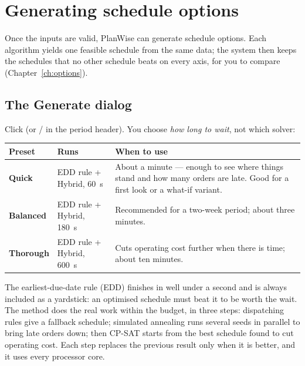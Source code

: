 \chapter{Generating schedule options}\label{ch:generate}

Once the inputs are valid, PlanWise can generate schedule options. Each algorithm yields one feasible
schedule from the same data; the system then keeps the schedules that no other schedule beats on every axis,
for you to compare (Chapter~\ref{ch:options}).


\section{The Generate dialog}

Click  (or  /  in the period header).
You choose \emph{how long to wait}, not which solver:


\begin{center}
\begin{tabularx}{\linewidth}{>{\bfseries}p{2.2cm}p{3.6cm}X}
\toprule
\rowcolor{white}Preset & Runs & When to use \\
\midrule
Quick & EDD rule + Hybrid, 60~s & About a minute --- enough to see where things stand and how many orders are late. Good for a first look or a what-if variant. \\
Balanced & EDD rule + Hybrid, 180~s & Recommended for a two-week period; about three minutes. \\
Thorough & EDD rule + Hybrid, 600~s & Cuts operating cost further when there is time; about ten minutes. \\
\bottomrule
\end{tabularx}
\end{center}

The earliest-due-date rule (EDD) finishes in well under a second and is always included as a yardstick: an
optimised schedule must beat it to be worth the wait. The  method does the real work within the
budget, in three steps: dispatching rules give a fallback schedule; simulated annealing runs several seeds in
parallel to bring late orders down; then CP-SAT starts from the best schedule found to cut operating cost.
Each step replaces the previous result only when it is better, and it uses every processor core.

